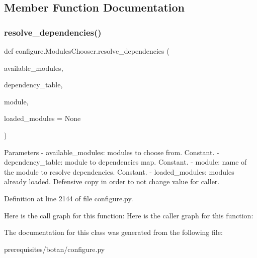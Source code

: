 \subsection{Member Function Documentation}
\mbox{\label{classconfigure_1_1_modules_chooser_a3beffd91af562bbee908ec4f1d499bec}} 
\subsubsection{\texorpdfstring{resolve\+\_\+dependencies()}{resolve\_dependencies()}}
{\footnotesize\ttfamily def configure.\+Modules\+Chooser.\+resolve\+\_\+dependencies (\begin{DoxyParamCaption}\item[{}]{available\+\_\+modules,  }\item[{}]{dependency\+\_\+table,  }\item[{}]{module,  }\item[{}]{loaded\+\_\+modules = {\ttfamily None} }\end{DoxyParamCaption})\hspace{0.3cm}{\ttfamily [static]}}

\begin{DoxyVerb}Parameters
- available_modules: modules to choose from. Constant.
- dependency_table: module to dependencies map. Constant.
- module: name of the module to resolve dependencies. Constant.
- loaded_modules: modules already loaded. Defensive copy in order to not change value for caller.
\end{DoxyVerb}
 

Definition at line 2144 of file configure.\+py.

Here is the call graph for this function\+:
Here is the caller graph for this function\+:


The documentation for this class was generated from the following file\+:\begin{DoxyCompactItemize}
\item 
prerequisites/botan/configure.\+py\end{DoxyCompactItemize}
